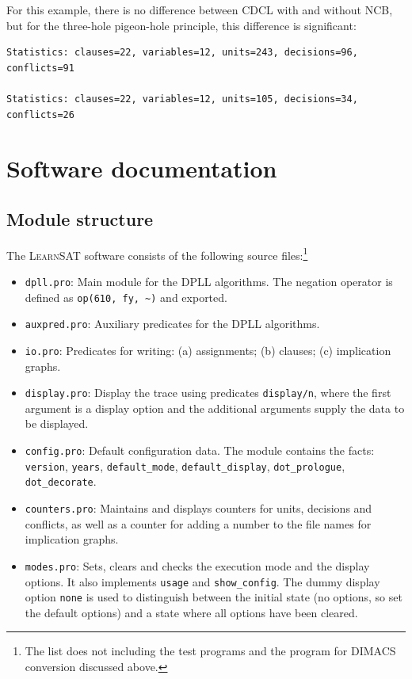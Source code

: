 \documentclass[11pt]{report}
\newcommand*{\p}[1]{\textup{\texttt{#1}}}
\newcommand*{\ls}{\textsc{LearnSAT}}
\begin{document}
For this example, there is no difference between CDCL with and without
NCB, but for the three-hole pigeon-hole principle, this difference is
significant:
\begin{verbatim}
Statistics: clauses=22, variables=12, units=243, decisions=96, conflicts=91

Statistics: clauses=22, variables=12, units=105, decisions=34, conflicts=26
\end{verbatim}




\chapter{Software documentation}

\section{Module structure}

The \ls{} software consists of the following source files:\footnote{The
list does not including the test programs and the program for DIMACS
conversion discussed above.}

\begin{itemize}
\item \p{dpll.pro}: Main module for the DPLL algorithms.
The negation operator is defined as \verb+op(610, fy, ~)+ and exported.

\item \p{auxpred.pro}: Auxiliary predicates for the DPLL algorithms. 

\item \p{io.pro}: Predicates for writing: (a) assignments; (b) clauses;
(c) implication graphs.

\item \p{display.pro}: Display the trace using predicates \p{display/n},
where the first argument is a display option and the additional
arguments supply the data to be displayed.

\item \p{config.pro}: Default configuration data. The module contains
the facts: \p{version}, \p{years}, \p{default\_mode},
\p{default\_display}, \p{dot\_prologue}, \p{dot\_decorate}.

\item \p{counters.pro}: Maintains and displays counters for units,
decisions and conflicts, as well as a counter for adding a number to the
file names for implication graphs.

\item \p{modes.pro}: Sets, clears and checks the execution mode and the
display options. It also implements \p{usage} and \p{show\_config}. The
dummy display option \p{none} is used to distinguish between the initial
state (no options, so set the default options) and a state where all
options have been cleared.

\end{itemize}
\end{document}
